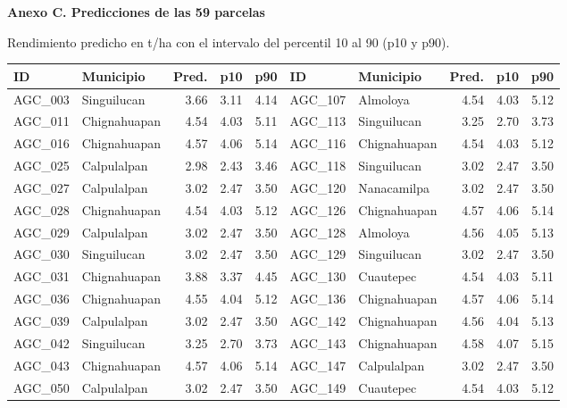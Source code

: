 \documentclass[10pt,letterpaper]{article}
\begin{document}
\par\vspace{8pt}\noindent\begin{minipage}{\textwidth}
\textbf{Anexo C. Predicciones de las 59 parcelas}\par\vspace{3pt}
Rendimiento predicho en t/ha con el intervalo del percentil 10 al 90 (p10 y p90).

\small
\setlength{\tabcolsep}{3pt}
\begin{tabular}{@{}llrrr@{\hspace{10pt}}llrrr@{}}
\toprule
ID & Municipio & Pred. & p10 & p90 & ID & Municipio & Pred. & p10 & p90 \\
\midrule
AGC\_003 & Singuilucan & 3.66 & 3.11 & 4.14 & AGC\_107 & Almoloya & 4.54 & 4.03 & 5.12 \\
AGC\_011 & Chignahuapan & 4.54 & 4.03 & 5.11 & AGC\_113 & Singuilucan & 3.25 & 2.70 & 3.73 \\
AGC\_016 & Chignahuapan & 4.57 & 4.06 & 5.14 & AGC\_116 & Chignahuapan & 4.54 & 4.03 & 5.12 \\
AGC\_025 & Calpulalpan & 2.98 & 2.43 & 3.46 & AGC\_118 & Singuilucan & 3.02 & 2.47 & 3.50 \\
AGC\_027 & Calpulalpan & 3.02 & 2.47 & 3.50 & AGC\_120 & Nanacamilpa & 3.02 & 2.47 & 3.50 \\
AGC\_028 & Chignahuapan & 4.54 & 4.03 & 5.12 & AGC\_126 & Chignahuapan & 4.57 & 4.06 & 5.14 \\
AGC\_029 & Calpulalpan & 3.02 & 2.47 & 3.50 & AGC\_128 & Almoloya & 4.56 & 4.05 & 5.13 \\
AGC\_030 & Singuilucan & 3.02 & 2.47 & 3.50 & AGC\_129 & Singuilucan & 3.02 & 2.47 & 3.50 \\
AGC\_031 & Chignahuapan & 3.88 & 3.37 & 4.45 & AGC\_130 & Cuautepec & 4.54 & 4.03 & 5.11 \\
AGC\_036 & Chignahuapan & 4.55 & 4.04 & 5.12 & AGC\_136 & Chignahuapan & 4.57 & 4.06 & 5.14 \\
AGC\_039 & Calpulalpan & 3.02 & 2.47 & 3.50 & AGC\_142 & Chignahuapan & 4.56 & 4.04 & 5.13 \\
AGC\_042 & Singuilucan & 3.25 & 2.70 & 3.73 & AGC\_143 & Chignahuapan & 4.58 & 4.07 & 5.15 \\
AGC\_043 & Chignahuapan & 4.57 & 4.06 & 5.14 & AGC\_147 & Calpulalpan & 3.02 & 2.47 & 3.50 \\
AGC\_050 & Calpulalpan & 3.02 & 2.47 & 3.50 & AGC\_149 & Cuautepec & 4.54 & 4.03 & 5.12 \\

\end{tabular}
\end{minipage}
\end{document}
